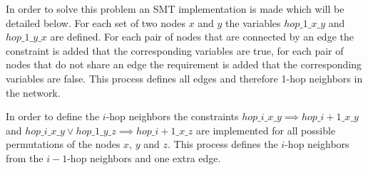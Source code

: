 In order to solve this problem an SMT implementation is made which will be detailed below. For each set of two nodes $x$ and $y$ the variables $hop\_1\_x\_y$ and $hop\_1\_y\_x$ are defined. For each pair of nodes that are connected by an edge the constraint is added that the corresponding variables are true, for each pair of nodes that do not share an edge the requirement is added that the corresponding variables are false. This process defines all edges and therefore 1-hop neighbors in the network.

In order to define the $i$-hop neighbors the constraints $hop\_i\_x\_y \implies hop\_{i+1}\_x\_y$ and $hop\_i\_x\_y \vee hop\_1\_y\_z \implies hop\_{i+1}\_x\_z$ are implemented for all possible permutations of the nodes $x$, $y$ and $z$. This process defines the $i$-hop neighbors from the $i-1$-hop neighbors and one extra edge.

